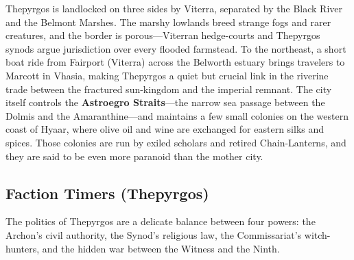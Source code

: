 Thepyrgos is landlocked on three sides by Viterra, separated by the Black River and the Belmont Marshes. The marshy lowlands breed strange fogs and rarer creatures, and the border is porous---Viterran hedge-courts and Thepyrgos synods argue jurisdiction over every flooded farmstead. To the northeast, a short boat ride from Fairport (Viterra) across the Belworth estuary brings travelers to Marcott in Vhasia, making Thepyrgos a quiet but crucial link in the riverine trade between the fractured sun-kingdom and the imperial remnant. The city itself controls the \textbf{Astroegro Straits}---the narrow sea passage between the Dolmis and the Amaranthine---and maintains a few small colonies on the western coast of Hyaar, where olive oil and wine are exchanged for eastern silks and spices. Those colonies are run by exiled scholars and retired Chain-Lanterns, and they are said to be even more paranoid than the mother city.

\subsection*{Faction Timers (Thepyrgos)}
\label{sec:thepyrgos-faction-timers}

The politics of Thepyrgos are a delicate balance between four powers: the Archon's civil authority, the Synod's religious law, the Commissariat's witch-hunters, and the hidden war between the Witness and the Ninth.

